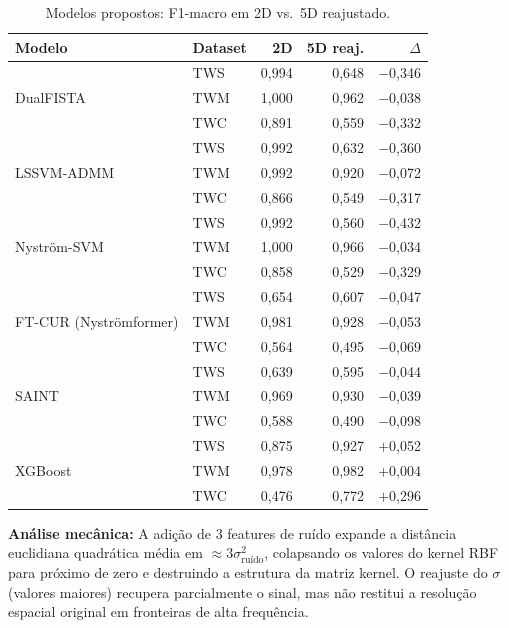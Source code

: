 \documentclass[12pt,a4paper]{article}
\begin{document}
\begin{table}[H]
\centering
\caption{Modelos propostos: F1-macro em 2D vs.\ 5D reajustado.}
\label{tab:5f_proposed}
\begin{tabular}{llrrr}
\toprule
\textbf{Modelo} & \textbf{Dataset} & \textbf{2D} & \textbf{5D reaj.} & \textbf{$\Delta$} \\
\midrule
\multirow{3}{*}{DualFISTA}
  & TWS & 0,994 & 0,648 & $-$0,346 \\
  & TWM & 1,000 & 0,962 & $-$0,038 \\
  & TWC & 0,891 & 0,559 & $-$0,332 \\
\midrule
\multirow{3}{*}{LSSVM-ADMM}
  & TWS & 0,992 & 0,632 & $-$0,360 \\
  & TWM & 0,992 & 0,920 & $-$0,072 \\
  & TWC & 0,866 & 0,549 & $-$0,317 \\
\midrule
\multirow{3}{*}{Nyström-SVM}
  & TWS & 0,992 & 0,560 & $-$0,432 \\
  & TWM & 1,000 & 0,966 & $-$0,034 \\
  & TWC & 0,858 & 0,529 & $-$0,329 \\
\midrule
\multirow{3}{*}{FT-CUR (Nyströmformer)}
  & TWS & 0,654 & 0,607 & $-$0,047 \\
  & TWM & 0,981 & 0,928 & $-$0,053 \\
  & TWC & 0,564 & 0,495 & $-$0,069 \\
\midrule
\multirow{3}{*}{SAINT}
  & TWS & 0,639 & 0,595 & $-$0,044 \\
  & TWM & 0,969 & 0,930 & $-$0,039 \\
  & TWC & 0,588 & 0,490 & $-$0,098 \\
\midrule
\multirow{3}{*}{XGBoost}
  & TWS & 0,875 & 0,927 & $+$0,052 \\
  & TWM & 0,978 & 0,982 & $+$0,004 \\
  & TWC & 0,476 & 0,772 & $+$0,296 \\
\bottomrule
\end{tabular}
\end{table}

\textbf{Análise mecânica:} A adição de 3 features de ruído expande a distância
euclidiana quadrática média em $\approx 3\sigma_\text{ruído}^2$, colapsando os
valores do kernel RBF para próximo de zero e destruindo a estrutura da matriz
kernel. O reajuste do $\sigma$ (valores maiores) recupera parcialmente o sinal,
mas não restitui a resolução espacial original em fronteiras de alta frequência.
\end{document}
